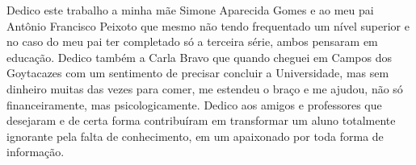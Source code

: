 



\begin{dedicatoria}
   \vspace*{\fill}
   \centering
   \noindent
   \textit{}
    Dedico este trabalho a minha mãe Simone Aparecida Gomes e ao meu pai Antônio Francisco Peixoto que mesmo não tendo frequentado um nível superior e no caso do meu pai ter completado só a terceira série, ambos pensaram em educação. Dedico também a Carla Bravo que quando cheguei em Campos dos Goytacazes com um sentimento de precisar concluir a Universidade, mas sem dinheiro muitas das vezes para comer, me estendeu o braço e me ajudou, não só financeiramente, mas psicologicamente. Dedico aos amigos e professores que desejaram e de certa forma contribuíram em transformar um aluno totalmente ignorante pela falta de conhecimento, em um apaixonado por toda forma de informação.
    
   \vspace*{\fill}
\end{dedicatoria}


